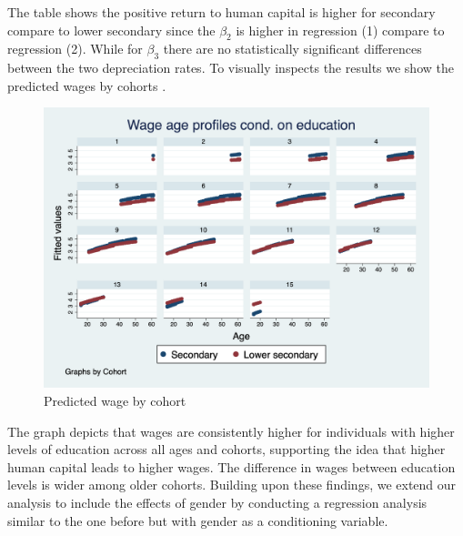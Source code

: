 \documentclass[14pt]{sistedes}
\begin{document}
The table shows the positive return to human capital is higher for secondary compare to lower secondary since the
$\beta_2$ is higher in regression (1) compare to regression (2). While for $\beta_3$ there are no statistically
significant  differences between the two depreciation rates. To visually inspects the results we show the predicted
wages by cohorts .
\begin{figure}
    \centering
    \includegraphics[scale=0.3]{graph1.png}
    \caption{Predicted wage by cohort}
    \label{fig:pred_reg}
\end{figure}
The graph depicts that wages are consistently higher for individuals with higher levels of education across all ages and
cohorts, supporting the idea that higher human capital leads to higher wages. The difference in wages between education
levels is wider among older cohorts. Building upon these findings, we extend our analysis to include the effects of
gender by conducting a regression analysis similar to the one before but with gender as a conditioning variable.
\end{document}
